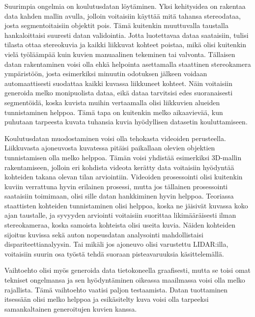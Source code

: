 Suurimpia ongelmia on koulutusdatan löytäminen.
Yksi kehitysidea on rakentaa data kahden mallin avulla, 
jolloin voitaisiin käyttää mitä tahansa stereodataa, josta segmentoitaisiin objektit pois.
Tämä kuitenkin muuttuvalla taustalla hankaloittaisi suuresti datan validointia.
Jotta luotettavaa dataa saataisiin, tulisi tilasta ottaa stereokuvia ja kaikki liikkuvat kohteet poistaa,
mikä olisi kuitenkin vielä työläämpää kuin kuvien manuaalinen tekeminen tai valvonta.
Tällaisen datan rakentaminen voisi olla ehkä helpointa asettamalla staattinen stereokamera ympäristöön,
josta esimerkiksi minuutin odotuksen jälkeen voidaan automaattisesti suodattaa kaikki kuvassa liikkuneet kohteet.
Näin voitaisiin generoida melko monipuolista dataa, eikä dataa tarvitsisi edes suoranaisesti segmentöidä,
koska kuvista muihin vertaamalla olisi liikkuvien alueiden tunnistaminen helppoa.
Tämä tapa on kuitenkin melko aikaavievää, kun puhutaan tarpeesta kuvata tuhansia kuvia hyödyllisen datasetin kouluttamiseen.

Koulutusdatan muodostaminen voisi olla tehokasta videoiden perusteella.
Liikkuvasta ajoneuvosta kuvatessa pitäisi paikallaan olevien objektien tunnistamisen olla melko helppoa.
Tämän voisi yhdistää esimerkiksi 3D-mallin rakentamiseen, jolloin eri kohdista videota kerätty data voitaisiin hyödyntää kohteiden takana olevan tilan arviointiin.
Videoiden prosessointi olisi kuitenkin kuviin verrattuna hyvin erilainen prosessi,
mutta jos tällainen prosessointi saataisiin toimimaan, olisi sille datan hankkiminen hyvin helppoa.
Teoriassa staattisten kohteiden tunnistaminen olisi helppoa, koska ne jäisivät kuvassa koko ajan taustalle,
ja syvyyden arviointi voitaisiin suorittaa likimääräisesti ilman stereokameraa, koska samoista kohteista olisi useita kuvia.
Näiden kohteiden sijoitus kuvissa sekä auton nopeusdatan analysointi mahdollistaisi dispariteettianalyysin.
Tai mikäli jos ajoneuvo olisi varustettu LIDAR:illa, voitaisiin suurin osa työstä tehdä suoraan pisteavaruuksia käsittelemällä.

Vaihtoehto olisi myös generoida data tietokoneella graafisesti,
mutta se toisi omat tekniset ongelmansa ja sen hyödyntäminen oikeassa maailmassa voisi olla melko rajallista.
Tämä vaihtoehto vaatisi paljon testaamista.
Datan tuottaminen itsessään olisi melko helppoa
ja esikäsitelty kuva voisi olla tarpeeksi samankaltainen generoitujen kuvien kanssa.
